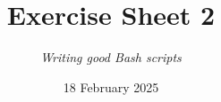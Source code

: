 




\title{{\vspace{-15mm}\huge\textbf{Exercise Sheet 2}}}
\author{\textit{Writing good Bash scripts}}
\date{{\small 18 February 2025}}


    \maketitle
    
    \medskip
    
    \medskip
    
    \newpage
    
    \newpage
    
    \medskip
    
